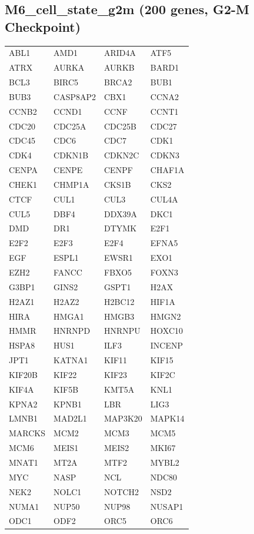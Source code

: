 \subsection*{M6\_cell\_state\_g2m (200 genes, G2-M Checkpoint)}
\begin{longtable}{llll}
ABL1 & AMD1 & ARID4A & ATF5 \\
ATRX & AURKA & AURKB & BARD1 \\
BCL3 & BIRC5 & BRCA2 & BUB1 \\
BUB3 & CASP8AP2 & CBX1 & CCNA2 \\
CCNB2 & CCND1 & CCNF & CCNT1 \\
CDC20 & CDC25A & CDC25B & CDC27 \\
CDC45 & CDC6 & CDC7 & CDK1 \\
CDK4 & CDKN1B & CDKN2C & CDKN3 \\
CENPA & CENPE & CENPF & CHAF1A \\
CHEK1 & CHMP1A & CKS1B & CKS2 \\
CTCF & CUL1 & CUL3 & CUL4A \\
CUL5 & DBF4 & DDX39A & DKC1 \\
DMD & DR1 & DTYMK & E2F1 \\
E2F2 & E2F3 & E2F4 & EFNA5 \\
EGF & ESPL1 & EWSR1 & EXO1 \\
EZH2 & FANCC & FBXO5 & FOXN3 \\
G3BP1 & GINS2 & GSPT1 & H2AX \\
H2AZ1 & H2AZ2 & H2BC12 & HIF1A \\
HIRA & HMGA1 & HMGB3 & HMGN2 \\
HMMR & HNRNPD & HNRNPU & HOXC10 \\
HSPA8 & HUS1 & ILF3 & INCENP \\
JPT1 & KATNA1 & KIF11 & KIF15 \\
KIF20B & KIF22 & KIF23 & KIF2C \\
KIF4A & KIF5B & KMT5A & KNL1 \\
KPNA2 & KPNB1 & LBR & LIG3 \\
LMNB1 & MAD2L1 & MAP3K20 & MAPK14 \\
MARCKS & MCM2 & MCM3 & MCM5 \\
MCM6 & MEIS1 & MEIS2 & MKI67 \\
MNAT1 & MT2A & MTF2 & MYBL2 \\
MYC & NASP & NCL & NDC80 \\
NEK2 & NOLC1 & NOTCH2 & NSD2 \\
NUMA1 & NUP50 & NUP98 & NUSAP1 \\
ODC1 & ODF2 & ORC5 & ORC6 \\

\end{longtable}
